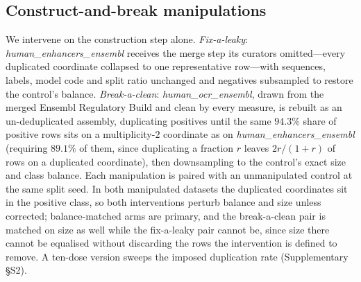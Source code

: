 \documentclass[webpdf,modern,large,namedate]{oup-authoring-template}%
\begin{document}
\subsection{Construct-and-break manipulations}\label{sec:m-manip}
We intervene on the construction step alone. \emph{Fix-a-leaky}: \textit{human\_enhancers\_ensembl} receives the merge step its curators omitted---every duplicated coordinate collapsed to one representative row---with sequences, labels, model code and split ratio unchanged and negatives subsampled to restore the control's balance. \emph{Break-a-clean}: \textit{human\_ocr\_ensembl}, drawn from the merged Ensembl Regulatory Build and clean by every measure, is rebuilt as an un-deduplicated assembly, duplicating positives until the same $94.3\%$ share of positive rows sits on a multiplicity-$2$ coordinate as on \textit{human\_enhancers\_ensembl} (requiring $89.1\%$ of them, since duplicating a fraction $r$ leaves $2r/(1+r)$ of rows on a duplicated coordinate), then downsampling to the control's exact size and class balance. Each manipulation is paired with an unmanipulated control at the same split seed. In both manipulated datasets the duplicated coordinates sit in the positive class, so both interventions perturb balance and size unless corrected; balance-matched arms are primary, and the break-a-clean pair is matched on size as well while the fix-a-leaky pair cannot be, since size there cannot be equalised without discarding the rows the intervention is defined to remove. A ten-dose version sweeps the imposed duplication rate (Supplementary \S S2).
\end{document}
